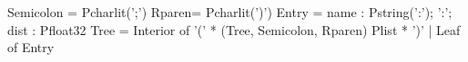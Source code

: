 \begin{code}\scriptsize
{} Semicolon = Pcharlit(';')
 Rparen= Pcharlit(')')
\mbox{}
 Entry = {
  name : Pstring(':');
  ':';
  dist : Pfloat32
}
\mbox{}
 Tree =
  Interior of '(' * (Tree, Semicolon, Rparen) Plist * ')'
| Leaf of Entry\end{code}
